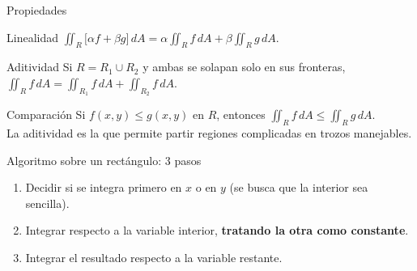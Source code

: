 \documentclass[11pt,aspectratio=169]{beamer}
\begin{document}
\begin{frame}{Propiedades}
  \begin{block}{Linealidad}
    \centering
    $\displaystyle\iint_R \bigl[\alpha f+\beta g\bigr]\,dA
      = \alpha\iint_R f\,dA + \beta\iint_R g\,dA$.
  \end{block}
  \pause
  \begin{block}{Aditividad}
    Si $R=R_1\cup R_2$ y ambas se solapan solo en sus fronteras,
    $\displaystyle\iint_R f\,dA = \iint_{R_1} f\,dA + \iint_{R_2} f\,dA$.
  \end{block}
  \pause
  \begin{block}{Comparación}
    Si $f(x,y)\le g(x,y)$ en $R$, entonces $\displaystyle\iint_R f\,dA \le \iint_R g\,dA$.\\[2pt]
    {\small\color{gray60} La aditividad es la que permite partir regiones complicadas en trozos manejables.}
  \end{block}
\end{frame}

\begin{frame}{Algoritmo sobre un rectángulo: 3 pasos}
  \begin{center}
  \end{center}
  \vspace{10pt}
  \begin{enumerate}
    \item Decidir si se integra primero en $x$ o en $y$ (se busca que la interior sea sencilla).
    \item Integrar respecto a la variable interior, \textbf{tratando la otra como constante}.
    \item Integrar el resultado respecto a la variable restante.
  \end{enumerate}
\end{frame}
\end{document}

